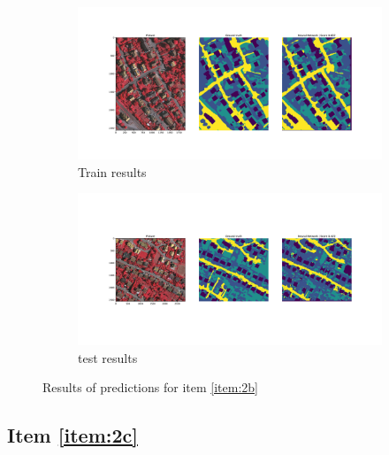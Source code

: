 \documentclass[10pt, a4paper]{article}
\begin{document}
\begin{figure}[htpb]
  \centering
  \begin{subfigure}[b]{1.0\textwidth}
      \centering
      \includegraphics[width=\textwidth]{images/Patch64_scratch_train.pdf}
      \caption{Train results}
      \label{fig:q2b_train}
  \end{subfigure}
  \hfill
  \begin{subfigure}[b]{1.0\textwidth}
    \centering
    \includegraphics[width=\textwidth]{images/Patch64_scratch_test.pdf}
    \caption{test results}
    \label{fig:q2b_test}
  \end{subfigure}
  \caption{Results of predictions for item \ref{item:2b}}
  \label{fig:q2b_results}
\end{figure}

\subsection{Item \ref{item:2c}}

\lipsum[1]
\end{document}
